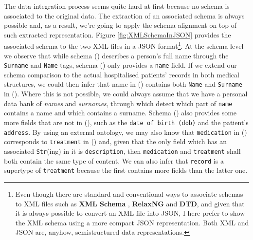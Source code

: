 The data integration process seems quite hard at first because no schema is associated to the original data. 
The extraction of an associated schema  is always possible \cite{BaaziziLCGS17} and, as a result, we're going to apply the schema alignment on top of such extracted representation. Figure \vref{fig:XMLSchemaInJSON} provides the associated schema to the two XML files in a JSON format\footnote{Even though there are standard and conventional ways to associate schemas to XML files such as \textbf{XML Schema} \cite{VlistXS}, \textbf{RelaxNG} and \textbf{DTD}, and given that it is always possible to convert an XML file into JSON, I here prefer to show the XML schema using a more compact JSON representation. Both XML and JSON are, anyhow, semistructured data representations.}. At the schema level we observe that while schema () describes a person's full name through the \texttt{Surname} and \texttt{Name} tags,  schema () only provides a \texttt{name} field. 
If we extend our schema comparison to the actual hospitalised patients’ records in both medical structures, we could then infer that name in  () contains both \texttt{Name} and \texttt{Surname} in (). Where this is not possible, we could always assume that we have a personal data bank of \textit{names} and \textit{surnames}, through which detect which part of \texttt{name} contains a name and which contains a surname. Schema () also provides some more fields that are not in (), such as the \texttt{date of birth (dob)} and the patient's \texttt{address}. By using an external ontology, we may also know that \texttt{medication} in () corresponds to \texttt{treatment} in () and, given that the only field which has an associated  \texttt{Str}(ing) in it is \texttt{description}, then \texttt{medication} and \texttt{treatment} shall both contain the same type of content. We can also infer that \texttt{record} is a supertype of \texttt{treatment} because the first contains more fields than the latter one.


